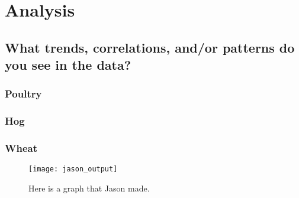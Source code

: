 \section{Analysis}

\subsection{What trends, correlations, and/or patterns do you see in the data?}

\subsubsection{Poultry}

\subsubsection{Hog}

\subsubsection{Wheat}



\begin{figure}
    \texttt{[image: jason\_output]}
    \caption{Here is a graph that Jason made.}
    \label{fig:jason1}
\end{figure}